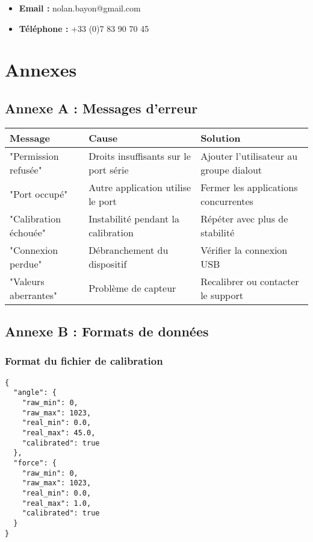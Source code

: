 \documentclass[12pt,a4paper]{article}
\begin{document}
\begin{itemize}
    \item \textbf{Email :} nolan.bayon@gmail.com
    \item \textbf{Téléphone :} +33 (0)7 83 90 70 45
\end{itemize}

\section{Annexes}

\subsection{Annexe A : Messages d'erreur}

\begin{longtable}{|p{4cm}|p{5cm}|p{5cm}|}
\hline
\textbf{Message} & \textbf{Cause} & \textbf{Solution} \\
\hline
\endhead
"Permission refusée" & Droits insuffisants sur le port série & Ajouter l'utilisateur au groupe dialout \\
\hline
"Port occupé" & Autre application utilise le port & Fermer les applications concurrentes \\
\hline
"Calibration échouée" & Instabilité pendant la calibration & Répéter avec plus de stabilité \\
\hline
"Connexion perdue" & Débranchement du dispositif & Vérifier la connexion USB \\
\hline
"Valeurs aberrantes" & Problème de capteur & Recalibrer ou contacter le support \\
\hline
\end{longtable}

\subsection{Annexe B : Formats de données}

\subsubsection{Format du fichier de calibration}

\begin{lstlisting}
{
  "angle": {
    "raw_min": 0,
    "raw_max": 1023,
    "real_min": 0.0,
    "real_max": 45.0,
    "calibrated": true
  },
  "force": {
    "raw_min": 0,
    "raw_max": 1023,
    "real_min": 0.0,
    "real_max": 1.0,
    "calibrated": true
  }
}
\end{lstlisting}
\end{document}
